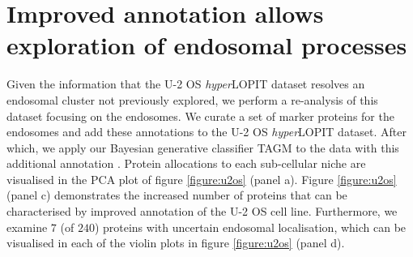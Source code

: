 \documentclass[12pt,english]{article}
\begin{document}
\section{Improved annotation allows exploration of endosomal processes}\label{section:endo}
Given the information that the U-2 OS \textit{hyper}LOPIT dataset resolves an endosomal cluster not previously explored, we perform a re-analysis of this dataset focusing on the endosomes. We curate a set of marker proteins for the endosomes and add these annotations to the U-2 OS \textit{hyper}LOPIT dataset. After which, we apply our Bayesian generative classifier TAGM to the data with this additional annotation \citep{Crook:2018}. Protein allocations to each sub-cellular niche are visualised in the PCA plot of figure \ref{figure:u2os} (panel a). Figure \ref{figure:u2os} (panel c) demonstrates the increased number of proteins that can be characterised by improved annotation of the U-2 OS cell line. Furthermore, we examine $7$ (of $240$) proteins with uncertain endosomal localisation, which can be visualised in each of the violin plots in figure \ref{figure:u2os} (panel d).
\end{document}
